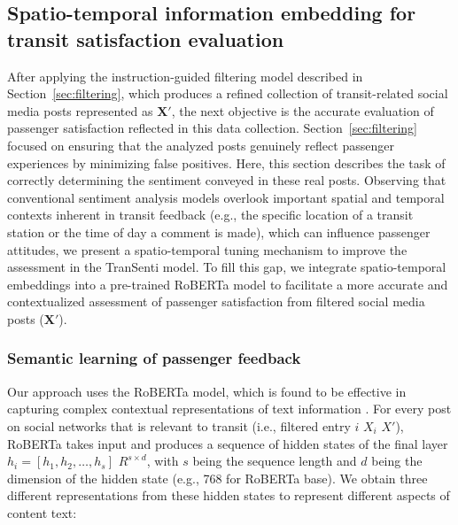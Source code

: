 \documentclass[a4paper,fleqn,12pt]{cas-sc}
\begin{document}
\subsection{Spatio-temporal information embedding for transit satisfaction evaluation}\label{sec:SatisfMethod}
After applying the instruction-guided filtering model described in Section~\ref{sec:filtering}, which produces a refined collection of transit-related social media posts represented as $\boldsymbol{X}'$, the next objective is the accurate evaluation of passenger satisfaction reflected in this data collection. Section~\ref{sec:filtering} focused on ensuring that the analyzed posts genuinely reflect passenger experiences by minimizing false positives. Here, this section describes the task of correctly determining the sentiment conveyed in these real posts. Observing that conventional sentiment analysis models overlook important spatial and temporal contexts inherent in transit feedback (e.g., the specific location of a transit station or the time of day a comment is made), which can influence passenger attitudes, we present a spatio-temporal tuning mechanism to improve the assessment in the TranSenti model. To fill this gap, we integrate spatio-temporal embeddings into a pre-trained RoBERTa model to facilitate a more accurate and contextualized assessment of passenger satisfaction from filtered social media posts ($\boldsymbol{X}'$).

\subsubsection{Semantic learning of passenger feedback}

Our approach uses the RoBERTa model, which is found to be effective in capturing complex contextual representations of text information \citep{liu2019roberta}. For every post on social networks that is relevant to transit (i.e., filtered entry \(i\) \(X_i\) \(X'\)), RoBERTa takes input and produces a sequence of hidden states of the final layer \(h_i = [h_1,h_2,\ldots,h_s]\) \(R^{s \times d}\), with \(s\) being the sequence length and \(d\) being the dimension of the hidden state (e.g., 768 for RoBERTa base). We obtain three different representations from these hidden states to represent different aspects of content text:
\end{document}
